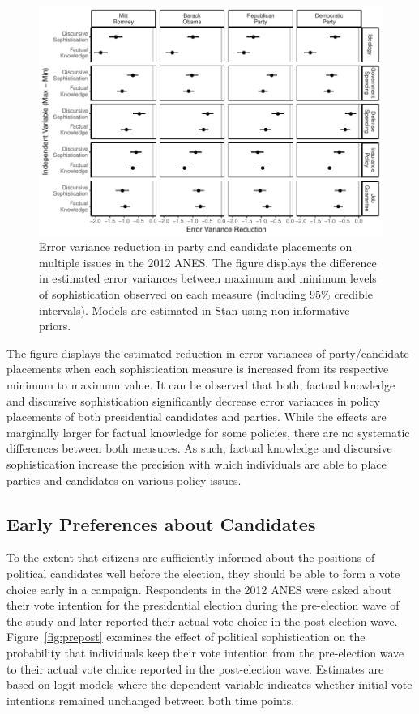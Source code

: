 \documentclass[12pt]{article}
\begin{document}
\begin{figure}[h]\centering
\includegraphics{../fig/hetreg.pdf}
\caption{Error variance reduction in party and candidate placements on multiple issues in the 2012 ANES. The figure displays the difference in estimated error variances between maximum and minimum levels of sophistication observed on each measure (including 95\% credible intervals). Models are estimated in Stan using non-informative priors.}\label{fig:hetreg}
\end{figure}

The figure displays the estimated reduction in error variances of party/candidate placements when each sophistication measure is increased from its respective minimum to maximum value. It can be observed that both, factual knowledge and discursive sophistication significantly decrease error variances in policy placements of both presidential candidates and parties. While the effects are marginally larger for factual knowledge for some policies, there are no systematic differences between both measures. As such, factual knowledge and discursive sophistication increase the precision with which individuals are able to place parties and candidates on various policy issues.


\subsection*{Early Preferences about Candidates}

To the extent that citizens are sufficiently informed about the positions of political candidates well before the election, they should be able to form a vote choice early in a campaign. Respondents in the 2012 ANES were asked about their vote intention for the presidential election during the pre-election wave of the study and later reported their actual vote choice in the post-election wave. Figure~\ref{fig:prepost} examines the effect of political sophistication on the probability that individuals keep their vote intention from the pre-election wave to their actual vote choice reported in the post-election wave. Estimates are based on logit models where the dependent variable indicates whether initial vote intentions remained unchanged between both time points.
\end{document}
